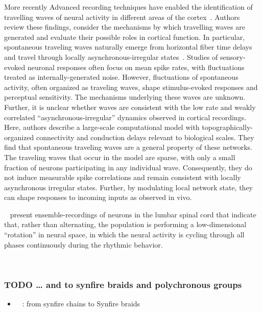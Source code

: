 \documentclass[brainsci, %
               review,submit,pdftex,moreauthors%
               ]{Definitions/mdpi}
\begin{document}
More recently Advanced recording techniques have enabled the identification of travelling waves of neural activity in different areas of the cortex~\citep{muller_cortical_2018}. Authors review these findings, consider the mechanisms by which travelling waves are generated and evaluate their possible roles in cortical function. In particular, spontaneous traveling waves naturally emerge from horizontal fiber time delays and travel through locally asynchronous-irregular states~\citep{davis_spontaneous_2021}. Studies of sensory-evoked neuronal responses often focus on mean spike rates, with fluctuations treated as internally-generated noise. However, fluctuations of spontaneous activity, often organized as traveling waves, shape stimulus-evoked responses and perceptual sensitivity. The mechanisms underlying these waves are unknown. Further, it is unclear whether waves are consistent with the low rate and weakly correlated ``asynchronous-irregular'' dynamics observed in cortical recordings. Here, authors describe a large-scale computational model with topographically-organized connectivity and conduction delays relevant to biological scales. They find that spontaneous traveling waves are a general property of these networks. The traveling waves that occur in the model are sparse, with only a small fraction of neurons participating in any individual wave. Consequently, they do not induce measurable spike correlations and remain consistent with locally asynchronous irregular states. Further, by modulating local network state, they can shape responses to incoming inputs as observed in vivo.

~\citep{linden_movement_2021} present ensemble-recordings of neurons in the lumbar spinal cord that indicate that, rather than alternating, the population is performing a low-dimensional ``rotation'' in neural space, in which the neural activity is cycling through all phases continuously during the rhythmic behavior.



~\citep{chemla_suppressive_2019}

\subsubsection{TODO \ldots{} and to synfire braids and polychronous groups}\label{todo-and-to-synfire-braids-and-polychronous-groups}
\begin{itemize}
 \item
 ~\citep{bienenstock_model_1995} : from synfire chains to Synfire braids
\end{itemize}
\end{document}
